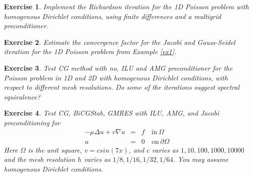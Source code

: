 \documentclass[a4paper,11pt]{amsart}
\newtheorem{exercise}{Exercise}[section]
\begin{document}
\begin{exercise}
Implement the Richardson iteration for the 1D Poisson problem with homogenous
Dirichlet conditions, using finite differences and a multigrid preconditioner. 
\end{exercise}

\begin{exercise}
Estimate the convergence factor for the Jacobi and Gauss-Seidel iteration for the 1D Poisson problem from Example \ref{ex1}.
\end{exercise}

\begin{exercise}
\label{ex:poisson}
Test CG method with no, ILU and AMG preconditioner for the Poisson problem in 1D and 2D with
homogenous Dirichlet conditions,  with respect
to different mesh resolutions. Do some of the iterations suggest spectral equivalence?
\end{exercise}

\begin{exercise}
\label{ex:conv}
Test CG, BiCGStab, GMRES with ILU, AMG, and Jacobi preconditioning for 
\begin{eqnarray*}
-\mu\Delta u + v\nabla u   &=& f \quad \textrm{in}\ \Omega\\
u&=& 0 \quad \textrm{on}\ \partial\Omega
\end{eqnarray*}
Here $\Omega$ is the unit square, $v=c sin(7 x)$, and $c$ varies as $1, 10, 100, 1000, 10 000$ and
the mesh resolution $h$ varies as $1/8, 1/16, 1/32, 1/64$. You may assume homogenous Dirichlet conditions.  

\end{exercise}
\end{document}
